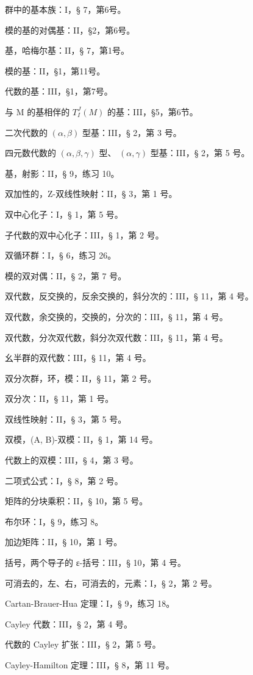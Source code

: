 群中的基本族：I，§ 7，第6号。

模的基的对偶基：II，§2，第6号。

基，哈梅尔基：II，§ 7，第1号。

模的基：II，§1，第11号。

代数的基：III，§1，第7号。

与 M 的基相伴的 \(T_{I}^{J}(M)\) 的基：III，§5，第6节。

二次代数的 \((\alpha, \beta)\) 型基：III，§ 2，第 3 号。

四元数代数的 \((\alpha, \beta, \gamma)\) 型、 \((\alpha, \gamma)\) 型基：III，§ 2，第 5 号。

基，射影：II，§ 9，练习 10。

双加性的，Z-双线性映射：II，§ 3，第 1 号。

双中心化子：I，§ 1，第 5 号。

子代数的双中心化子：III，§ 1，第 2 号。

双循环群：I，§ 6，练习 26。

模的双对偶：II，§ 2，第 7 号。

双代数，反交换的，反余交换的，斜分次的：III，§ 11，第 4 号。

双代数，余交换的，交换的，分次的：III，§ 11，第 4 号。

双代数，分次双代数，斜分次双代数：III，§ 11，第 4 号。

幺半群的双代数：III，§ 11，第 4 号。

双分次群，环，模：II，§ 11，第 2 号。

双分次：II，§ 11，第 1 号。

双线性映射：II，§ 3，第 5 号。

双模，(A, B)-双模：II，§ 1，第 14 号。

代数上的双模：III，§ 4，第 3 号。

二项式公式：I，§ 8，第 2 号。

矩阵的分块乘积：II，§ 10，第 5 号。

布尔环：I，§ 9，练习 8。

加边矩阵：II，§ 10，第 1 号。

括号，两个导子的 ε-括号：III，§ 10，第 4 号。

可消去的，左、右，可消去的，元素：I，§ 2，第 2 号。

Cartan-Brauer-Hua 定理：I，§ 9，练习 18。

Cayley 代数：III，§ 2，第 4 号。

代数的 Cayley 扩张：III，§ 2，第 5 号。

Cayley-Hamilton 定理：III，§ 8，第 11 号。

